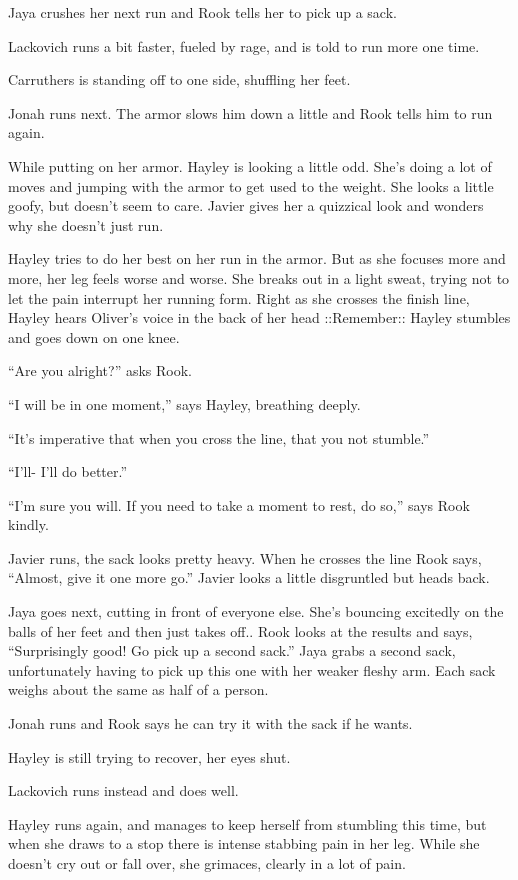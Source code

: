 Jaya crushes her next run and Rook tells her to pick up a sack.

Lackovich runs a bit faster, fueled by rage, and is told to run more one time.

Carruthers is standing off to one side, shuffling her feet.

Jonah runs next. The armor slows him down a little and Rook tells him to run again.

While putting on her armor. Hayley is looking a little odd. She's doing a lot of moves and jumping with the armor to get used to the weight.  She looks a little goofy, but doesn't seem to care.  Javier gives her a quizzical look and wonders why she doesn't just run.

Hayley tries to do her best on her run in the armor.  But as she focuses more and more, her leg feels worse and worse.  She breaks out in a light sweat, trying not to let the pain interrupt her running form.  Right as she crosses the finish line, Hayley hears Oliver's voice in the back of her head  {\color[RGB]{106,168,79}::Remember::  } Hayley stumbles and goes down on one knee.

``Are you alright?'' asks Rook.

``I will be in one moment,'' says Hayley, breathing deeply.

``It's imperative that when you cross the line, that you not stumble.''

``I'll- I'll do better.''

``I'm sure you will.  If you need to take a moment to rest, do so,'' says Rook kindly.



Javier runs, the sack looks pretty heavy.  When he crosses the line Rook says, ``Almost, give it one more go.''  Javier looks a little disgruntled but heads back.

Jaya goes next, cutting in front of everyone else.  She's bouncing excitedly on the balls of her feet and then just takes off..  Rook looks at the results and says, ``Surprisingly good!  Go pick up a second sack.''  Jaya grabs a second sack, unfortunately having to pick up this one with her weaker fleshy arm.  Each sack weighs about the same as half of a person.

Jonah runs and Rook says he can try it with the sack if he wants.

Hayley is still trying to recover, her eyes shut.

Lackovich runs instead and does well.

Hayley runs again, and manages to keep herself from stumbling this time, but when she draws to a stop there is intense stabbing pain in her leg.  While she doesn't cry out or fall over, she grimaces, clearly in a lot of pain.

